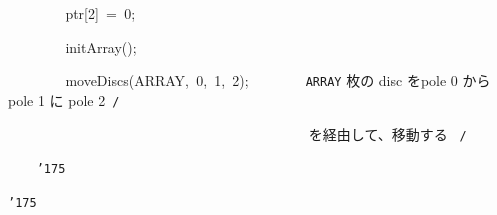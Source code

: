 \documentclass[a4paper,10pt]{article}
\def\mc{\relax}
\begin{document}
\noindent
\mbox{}{\tt\mc \ }{\tt\mc \ }{\tt\mc \ }{\tt\mc \ }{\tt\mc \ }{\tt\mc \ }{\tt\mc \ }{\tt\mc \ }ptr[2]{\tt\mc \ }={\tt\mc \ }0;

\noindent
\mbox{}\hfill

\noindent
\mbox{}{\tt\mc \ }{\tt\mc \ }{\tt\mc \ }{\tt\mc \ }{\tt\mc \ }{\tt\mc \ }{\tt\mc \ }{\tt\mc \ }initArray();

\noindent
\mbox{}{\tt\mc \ }{\tt\mc \ }{\tt\mc \ }{\tt\mc \ }{\tt\mc \ }{\tt\mc \ }{\tt\mc \ }{\tt\mc \ }moveDiscs(ARRAY,{\tt\mc \ }0,{\tt\mc \ }1,{\tt\mc \ }2);{\tt\mc \ }{\tt\mc \ }{\tt\mc \ }{\tt\mc \ }{\tt\mc \ }{\tt\mc \ }\rm\mc {\tt /}{\tt *}\  \ {\tt ARRAY} 枚の disc をpole 0 から pole 1 に pole 2\hfill \rm\mc \ {\tt *}{\tt /}
\tt\mc 

\noindent
\mbox{}{\tt\mc \ }{\tt\mc \ }{\tt\mc \ }{\tt\mc \ }{\tt\mc \ }{\tt\mc \ }{\tt\mc \ }{\tt\mc \ }{\tt\mc \ }{\tt\mc \ }{\tt\mc \ }{\tt\mc \ }{\tt\mc \ }{\tt\mc \ }{\tt\mc \ }{\tt\mc \ }{\tt\mc \ }{\tt\mc \ }{\tt\mc \ }{\tt\mc \ }{\tt\mc \ }{\tt\mc \ }{\tt\mc \ }{\tt\mc \ }{\tt\mc \ }{\tt\mc \ }{\tt\mc \ }{\tt\mc \ }{\tt\mc \ }{\tt\mc \ }{\tt\mc \ }{\tt\mc \ }{\tt\mc \ }{\tt\mc \ }{\tt\mc \ }{\tt\mc \ }{\tt\mc \ }{\tt\mc \ }{\tt\mc \ }{\tt\mc \ }\rm\mc {\tt /}{\tt *}\  \ を経由して、移動する \hfill \rm\mc \ {\tt *}{\tt /}
\tt\mc 

\noindent
\mbox{}{\tt\mc \ }{\tt\mc \ }{\tt\mc \ }{\tt\mc \ }{\tt\char'175}

\noindent
\mbox{}{\tt\char'175}

\rm\mc
\end{document}
